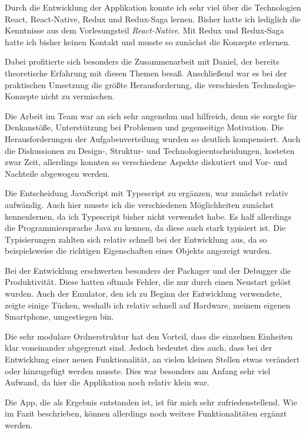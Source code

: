 Durch die Entwicklung der Applikation konnte ich sehr viel über die Technologien React, React-Native, Redux und Redux-Saga lernen.
Bisher hatte ich lediglich die Kenntnisse aus dem Vorlesungsteil \textit{React-Native}. Mit Redux und Redux-Saga hatte ich
bisher keinen Kontakt und musste so zunächst die Konzepte erlernen.

Dabei profitierte sich besonders die Zusammenarbeit mit Daniel, der bereits theoretische Erfahrung mit diesen Themen besaß.
Anschließend war es bei der praktischen Umsetzung die größte Herausforderung, die verschieden Technologie-Konzepte
nicht zu vermischen.

Die Arbeit im Team war an sich sehr angenehm und hilfreich, denn sie  sorgte für Denkanstöße, Unterstützung bei Problemen und gegenseitige Motivation.
Die Herausforderungen der Aufgabenverteilung wurden so deutlich kompensiert.
Auch die Diskussionen zu Design-, Struktur- und Technologieentscheidungen, kosteten zwar Zeit, allerdings konnten so verschiedene Aspekte diskutiert und
Vor- und Nachteile abgewogen werden.

Die Entscheidung JavaScript mit Typescript zu ergänzen, war zunächst relativ aufwändig. Auch hier musste ich die verschiedenen Möglichkeiten zunächst kennenlernen,
 da ich Typescript bisher nicht verwendet habe. Es half allerdings die Programmiersprache Java zu kennen, da diese auch stark typisiert ist.
Die Typisierungen zahlten sich relativ schnell bei der Entwicklung aus, da so beispielsweise die richtigen Eigenschaften eines Objekts angezeigt wurden.

Bei der Entwicklung erschwerten besonders der Packager und der Debugger die Produktivität.
Diese hatten oftmals Fehler, die nur durch einen Neustart gelöst wurden. Auch der Emulator, den ich zu Beginn der Entwicklung
verwendete, zeigte einige Tücken, weshalb ich relativ schnell auf Hardware, meinem eigenen Smartphone, umgestiegen bin.

Die sehr modulare Ordnerstruktur hat den Vorteil, dass die einzelnen Einheiten klar voneinander abgegrenzt sind.
Jedoch bedeutet dies auch, dass bei der Entwicklung einer neuen Funktionalität, an vielen kleinen Stellen etwas verändert oder
hinzugefügt werden musste. Dies war besonders am Anfang sehr viel Aufwand, da hier die Applikation noch relativ klein war.

Die App, die als Ergebnis entstanden ist, ist für mich sehr zufriedenstellend. Wie im Fazit beschrieben, können allerdings
noch weitere Funktionalitäten ergänzt werden.

